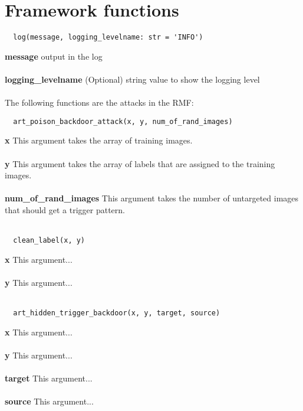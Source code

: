\section{Framework functions}
\label{sec:frame_func}

\begin{lstlisting}
  log(message, logging_levelname: str = 'INFO')
\end{lstlisting}

\noindent\textbf{message}
output in the log \\ \\
\textbf{logging\_levelname}
(Optional) string value to show the logging level \\ \\

The following functions are the attacks in the RMF: \\

\begin{lstlisting}
  art_poison_backdoor_attack(x, y, num_of_rand_images)
\end{lstlisting}

\noindent\textbf{x}
This argument takes the array of training images. \\ \\
\textbf{y}
This argument takes the array of labels that are assigned to the training images. \\ \\
\textbf{num\_of\_rand\_images}
This argument takes the number of untargeted images that should get a trigger pattern. \\ \\

\begin{lstlisting}
  clean_label(x, y)
\end{lstlisting}

\noindent\textbf{x}
This argument... \\ \\
\textbf{y}
This argument... \\ \\

\begin{lstlisting}
  art_hidden_trigger_backdoor(x, y, target, source)
\end{lstlisting}

\noindent\textbf{x}
This argument... \\ \\
\textbf{y}
This argument... \\ \\
\textbf{target}
This argument... \\ \\
\textbf{source}
This argument... \\ \\

